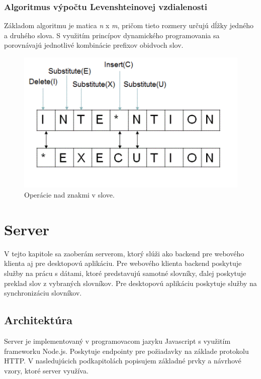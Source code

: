 \documentclass[
  digital, %
  table,   %
  lof,     %
  lot,     %
]{fithesis3}
\begin{document}
\subsection{Algoritmus výpočtu Levenshteinovej vzdialenosti}
Základom algoritmu je matica \textit{n} x \textit{m}, pričom tieto rozmery určujú dĺžky jedného a druhého slova. S využitím princípov dynamického programovania sa porovnávajú jednotlivé kombinácie prefixov obidvoch slov.

\begin{figure}
	\begin{center}
	\includegraphics[width=\textwidth]{img/distance.png}
	\end{center}
    \caption{Operácie nad znakmi v slove.}
	\label{fig:levenshtein}
\end{figure}




\chapter{Server}
V tejto kapitole sa zaoberám serverom, ktorý slúži ako backend pre webového klienta aj pre desktopovú aplikáciu. Pre webového klienta backend poskytuje služby na prácu s dátami, ktoré predstavujú samotné slovníky, ďalej poskytuje preklad slov z vybraných slovníkov. Pre desktopovú aplikáciu poskytuje služby na synchronizáciu slovníkov.

\section{Architektúra}
Server je implementovaný v programovacom jazyku Javascript s využitím frameworku Node.js. Poskytuje endpointy pre požiadavky na základe protokolu HTTP. V nasledujúcich podkapitolách popisujem základné prvky a návrhové vzory, ktoré server využíva.
\end{document}
